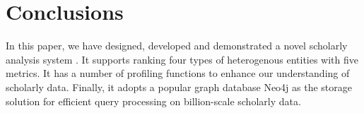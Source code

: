 \section{Conclusions}
\label{sec-conc}

In this paper, we have designed, developed and demonstrated a novel scholarly analysis system \oursystem.
It supports ranking four types of heterogenous entities with five metrics. It has a number of profiling functions to enhance our understanding of scholarly data.
Finally, it adopts a popular graph database Neo4j as the storage solution for efficient query processing on  billion-scale scholarly data.








